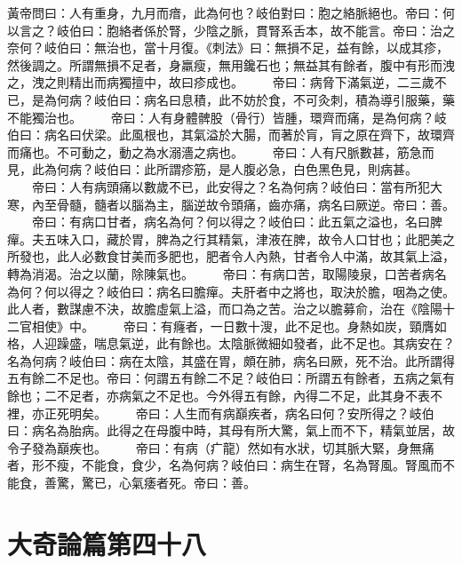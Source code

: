 黃帝問曰：人有重身，九月而瘖，此為何也？岐伯對曰：胞之絡脈絕也。帝曰：何以言之？岐伯曰：胞絡者係於腎，少陰之脈，貫腎系舌本，故不能言。帝曰：治之奈何？岐伯曰：無治也，當十月復。《刺法》曰：無損不足，益有餘，以成其疹，然後調之。所謂無損不足者，身羸瘦，無用鑱石也；無益其有餘者，腹中有形而洩之，洩之則精出而病獨擅中，故曰疹成也。
　　帝曰：病脅下滿氣逆，二三歲不已，是為何病？岐伯曰：病名曰息積，此不妨於食，不可灸刺，積為導引服藥，藥不能獨治也。
　　帝曰：人有身體髀股（骨行）皆腫，環齊而痛，是為何病？岐伯曰：病名曰伏梁。此風根也，其氣溢於大腸，而著於肓，肓之原在齊下，故環齊而痛也。不可動之，動之為水溺濇之病也。
　　帝曰：人有尺脈數甚，筋急而見，此為何病？岐伯曰：此所謂疹筋，是人腹必急，白色黑色見，則病甚。
　　帝曰：人有病頭痛以數歲不已，此安得之？名為何病？岐伯曰：當有所犯大寒，內至骨髓，髓者以腦為主，腦逆故令頭痛，齒亦痛，病名曰厥逆。帝曰：善。
　　帝曰：有病口甘者，病名為何？何以得之？岐伯曰：此五氣之溢也，名曰脾癉。夫五味入口，藏於胃，脾為之行其精氣，津液在脾，故令人口甘也；此肥美之所發也，此人必數食甘美而多肥也，肥者令人內熱，甘者令人中滿，故其氣上溢，轉為消渴。治之以蘭，除陳氣也。
　　帝曰：有病口苦，取陽陵泉，口苦者病名為何？何以得之？岐伯曰：病名曰膽癉。夫肝者中之將也，取決於膽，咽為之使。此人者，數謀慮不決，故膽虛氣上溢，而口為之苦。治之以膽募俞，治在《陰陽十二官相使》中。
　　帝曰：有癃者，一日數十溲，此不足也。身熱如炭，頸膺如格，人迎躁盛，喘息氣逆，此有餘也。太陰脈微細如發者，此不足也。其病安在？名為何病？岐伯曰：病在太陰，其盛在胃，頗在肺，病名曰厥，死不治。此所謂得五有餘二不足也。帝曰：何謂五有餘二不足？岐伯曰：所謂五有餘者，五病之氣有餘也；二不足者，亦病氣之不足也。今外得五有餘，內得二不足，此其身不表不裡，亦正死明矣。
　　帝曰：人生而有病巔疾者，病名曰何？安所得之？岐伯曰：病名為胎病。此得之在母腹中時，其母有所大驚，氣上而不下，精氣並居，故令子發為巔疾也。
　　帝曰：有病（疒龍）然如有水狀，切其脈大緊，身無痛者，形不瘦，不能食，食少，名為何病？岐伯曰：病生在腎，名為腎風。腎風而不能食，善驚，驚已，心氣痿者死。帝曰：善。

\section{大奇論篇第四十八}

